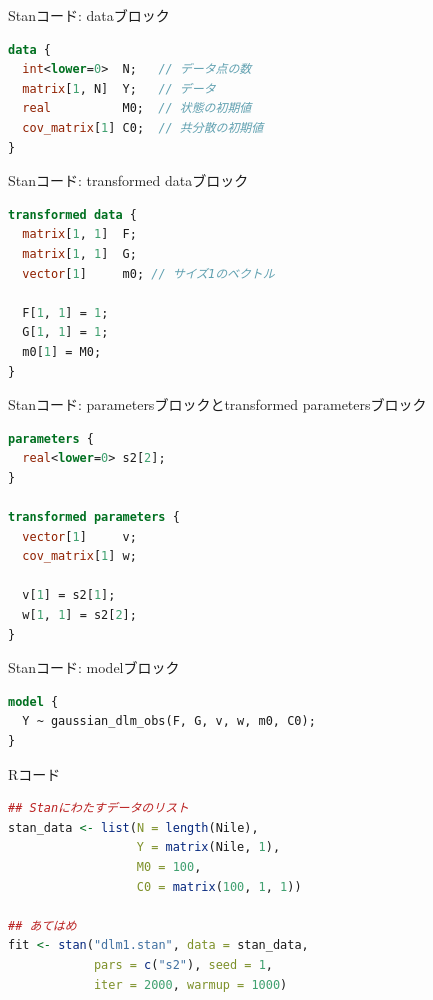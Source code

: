 \documentclass[dvipdfmx,12pt]{beamer}
\begin{document}
\begin{frame}[fragile]{Stanコード: dataブロック}
  \begin{lstlisting}[language=Stan]
data {
  int<lower=0>  N;   // データ点の数
  matrix[1, N]  Y;   // データ
  real          M0;  // 状態の初期値
  cov_matrix[1] C0;  // 共分散の初期値
}
  \end{lstlisting}
\end{frame}

\begin{frame}[fragile]{Stanコード: transformed dataブロック}
  \begin{lstlisting}[language=Stan]
transformed data {
  matrix[1, 1]  F;
  matrix[1, 1]  G;
  vector[1]     m0; // サイズ1のベクトル

  F[1, 1] = 1;
  G[1, 1] = 1;
  m0[1] = M0;
}
  \end{lstlisting}
\end{frame}

\begin{frame}[fragile]{Stanコード: parametersブロックとtransformed parametersブロック}
  \begin{lstlisting}[language=Stan]
parameters {
  real<lower=0> s2[2];
}

transformed parameters {
  vector[1]     v;
  cov_matrix[1] w;

  v[1] = s2[1];
  w[1, 1] = s2[2];
}
  \end{lstlisting}
\end{frame}

\begin{frame}[fragile]{Stanコード: modelブロック}
  \begin{lstlisting}[language=Stan]
model {
  Y ~ gaussian_dlm_obs(F, G, v, w, m0, C0);
}
  \end{lstlisting}
\end{frame}

\begin{frame}[fragile]{Rコード}
  \begin{lstlisting}[language=R]
## Stanにわたすデータのリスト
stan_data <- list(N = length(Nile),
                  Y = matrix(Nile, 1),
                  M0 = 100,
                  C0 = matrix(100, 1, 1))

## あてはめ
fit <- stan("dlm1.stan", data = stan_data,
            pars = c("s2"), seed = 1,
            iter = 2000, warmup = 1000)
  \end{lstlisting}
\end{frame}
\end{document}
